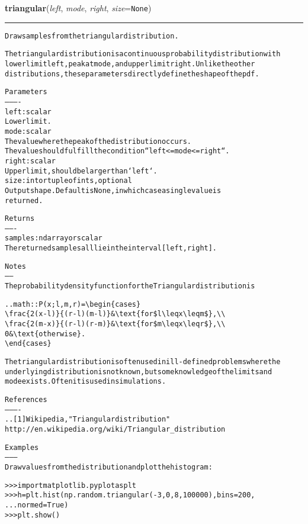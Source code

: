 \hspace{.8\funcindent}\begin{boxedminipage}{\funcwidth}

    \raggedright \textbf{triangular}(\textit{left}, \textit{mode}, \textit{right}, \textit{size}={\tt None})

    \vspace{-1.5ex}

    \rule{\textwidth}{0.5\fboxrule}
\setlength{\parskip}{2ex}
\begin{alltt}
Draw samples from the triangular distribution.

The triangular distribution is a continuous probability distribution with
lower limit left, peak at mode, and upper limit right. Unlike the other
distributions, these parameters directly define the shape of the pdf.

Parameters
----------
left : scalar
    Lower limit.
mode : scalar
    The value where the peak of the distribution occurs.
    The value should fulfill the condition ``left {\textless}= mode {\textless}= right``.
right : scalar
    Upper limit, should be larger than `left`.
size : int or tuple of ints, optional
    Output shape. Default is None, in which case a single value is
    returned.

Returns
-------
samples : ndarray or scalar
    The returned samples all lie in the interval [left, right].

Notes
-----
The probability density function for the Triangular distribution is

.. math:: P(x;l, m, r) = {\textbackslash}begin\{cases\}
          {\textbackslash}frac\{2(x-l)\}\{(r-l)(m-l)\}\& {\textbackslash}text\{for \$l {\textbackslash}leq x {\textbackslash}leq m\$\},{\textbackslash}{\textbackslash}
          {\textbackslash}frac\{2(m-x)\}\{(r-l)(r-m)\}\& {\textbackslash}text\{for \$m {\textbackslash}leq x {\textbackslash}leq r\$\},{\textbackslash}{\textbackslash}
          0\& {\textbackslash}text\{otherwise\}.
          {\textbackslash}end\{cases\}

The triangular distribution is often used in ill-defined problems where the
underlying distribution is not known, but some knowledge of the limits and
mode exists. Often it is used in simulations.

References
----------
..[1] Wikipedia, "Triangular distribution"
      http://en.wikipedia.org/wiki/Triangular\_distribution

Examples
--------
Draw values from the distribution and plot the histogram:

{\textgreater}{\textgreater}{\textgreater} import matplotlib.pyplot as plt
{\textgreater}{\textgreater}{\textgreater} h = plt.hist(np.random.triangular(-3, 0, 8, 100000), bins=200,
...              normed=True)
{\textgreater}{\textgreater}{\textgreater} plt.show()
\end{alltt}

\setlength{\parskip}{1ex}
    \end{boxedminipage}

